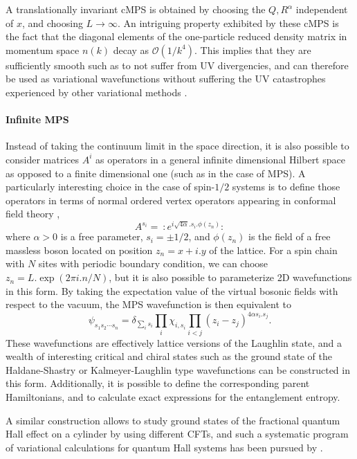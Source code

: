 \documentclass[rmp,aps,reprint,superscriptaddress,nobalancelastpage]{revtex4-1}
\begin{document}
A translationally invariant cMPS is obtained by choosing the $Q,R^\alpha$ independent of $x$, and choosing $L\rightarrow\infty$. An intriguing property exhibited by these cMPS is the fact that the diagonal elements of the one-particle reduced density matrix in momentum space $n(k)$ decay as $\mathcal{O}(1/k^4)$. This implies that they are sufficiently smooth such as to not suffer from UV divergencies, and can therefore be used
as variational wavefunctions without suffering the UV catastrophes experienced by other variational methods \cite{haegeman2010applying}.


\paragraph{Infinite MPS}

Instead of taking the continuum limit in the space direction, it is also possible to consider matrices $A^i$ as operators in a general infinite dimensional Hilbert space as opposed to a finite dimensional one (such as in the case of MPS). A particularly interesting choice in the case of spin-$1/2$ systems is to define those operators in terms of normal ordered vertex operators appearing in conformal field theory \cite{cirac2010infinite,nielsen2012laughlin,nielsen2013local,tu2014lattice},
\[A^{s_i}=\::e^{i\sqrt{4\alpha}.s_i.\phi(z_n)}:\]
where $\alpha>0$ is a free parameter, $s_i=\pm 1/2$, and $\phi(z_n)$ is the field of a free massless boson located on position $z_n=x+i.y$ of the lattice. For a spin chain with $N$ sites with periodic boundary condition, we can choose $z_n=L.\exp(2\pi i.n/N)$, but it is also possible to parameterize 2D wavefunctions in this form. By taking the expectation value of the virtual bosonic fields with respect to the vacuum,  the MPS wavefunction is then equivalent to
\[\psi_{s_1s_2\cdots s_n}=\delta_{\sum_i s_i}\prod_i\chi_{i,s_i}\prod_{i<j}\left(z_i-z_j\right)^{4\alpha s_i.s_j}.\]
These wavefunctions are effectively lattice versions of the Laughlin state, and a wealth of interesting critical and chiral states such as the ground state of the Haldane-Shastry or Kalmeyer-Laughlin type wavefunctions can be constructed in this form. Additionally, it is possible to define the corresponding parent Hamiltonians, and to calculate exact expressions for the entanglement entropy.

A similar construction allows to study ground states of the fractional quantum Hall effect on a cylinder by using different CFTs, and such a systematic program of variational calculations for quantum Hall systems has been pursued by \citet{zaletel2012exact,estienne2013matrix,zaletel2013topological,zaletel2015infinite}.
\end{document}

